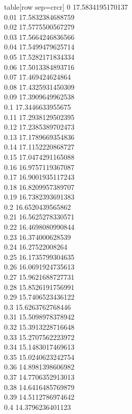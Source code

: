   table[row sep=crcr]{%
0	17.5834195170137\\
0.01	17.5832384688759\\
0.02	17.5775500567279\\
0.03	17.5664246836566\\
0.04	17.5499479625714\\
0.05	17.5282171834334\\
0.06	17.5013384893716\\
0.07	17.469424624864\\
0.08	17.4325931450309\\
0.09	17.3909649962538\\
0.1	17.3446633955675\\
0.11	17.2938129502395\\
0.12	17.2385389702473\\
0.13	17.1789669354836\\
0.14	17.1152220868727\\
0.15	17.0474291165088\\
0.16	16.9757119367087\\
0.17	16.9001935117243\\
0.18	16.8209957389707\\
0.19	16.7382393691383\\
0.2	16.6520439565862\\
0.21	16.5625278330571\\
0.22	16.4698080990844\\
0.23	16.374000628539\\
0.24	16.27522008264\\
0.25	16.1735799304635\\
0.26	16.0691924735613\\
0.27	15.9621688727731\\
0.28	15.8526191756991\\
0.29	15.7406523436122\\
0.3	15.6263762768446\\
0.31	15.5098978378942\\
0.32	15.3913228716648\\
0.33	15.2707562223972\\
0.34	15.1483017469613\\
0.35	15.0240623242754\\
0.36	14.8981398606982\\
0.37	14.7706352913013\\
0.38	14.6416485769879\\
0.39	14.5112786974642\\
0.4	14.3796236401123\\
}
